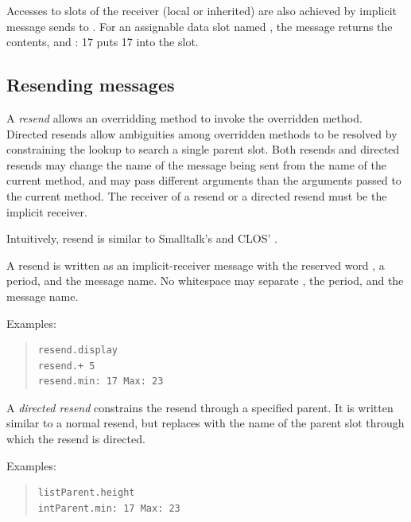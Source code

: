 \documentclass[letterpaper,10pt,english]{sphinxmanual}
\begin{document}
Accesses to slots of the receiver (local or inherited) are also achieved by implicit message sends to . For an assignable data slot named , the message  returns the contents, and : 17 puts 17 into the slot.


\subsection{Resending messages}
\label{langref:index-53}\label{langref:resending-messages}
A \emph{resend} allows an overridding method to invoke the overridden method. Directed resends allow ambiguities among overridden methods to be resolved by constraining the lookup to search a single parent slot. Both resends and directed resends may change the name of the message being sent from the name of the current method, and may pass different arguments than the arguments passed to the current method. The receiver of a resend or a directed resend must be the implicit receiver.

Intuitively, resend is similar to Smalltalk’s  and CLOS’ .

A resend is written as an implicit-receiver message with the reserved word , a period, and the message name. No whitespace may separate , the period, and the message name.

Examples:
\begin{quote}

\begin{Verbatim}[commandchars=\\\{\}]
resend.display
resend.+ 5
resend.min: 17 Max: 23
\end{Verbatim}
\end{quote}

A \emph{directed resend} constrains the resend through a specified parent. It is written similar to a normal resend, but replaces  with the name of the parent slot through which the resend is directed.

Examples:
\begin{quote}

\begin{Verbatim}[commandchars=\\\{\}]
listParent.height
intParent.min: 17 Max: 23
\end{Verbatim}
\end{quote}
\end{document}
